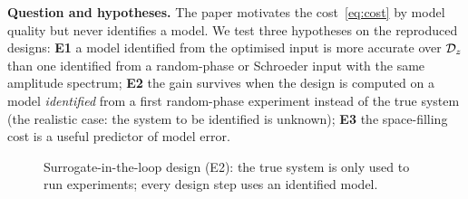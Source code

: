 \textbf{Question and hypotheses.} The paper motivates the cost~\eqref{eq:cost} by model quality but never
identifies a model. We test three hypotheses on the reproduced designs:
\textbf{E1} a model identified from the optimised input is more accurate over $\mathcal{D}_z$ than one identified
from a random-phase or Schroeder input with the same amplitude spectrum;
\textbf{E2} the gain survives when the design is computed on a model \emph{identified} from a first
random-phase experiment instead of the true system (the realistic case: the system to be identified is
unknown);
\textbf{E3} the space-filling cost is a useful predictor of model error.

\begin{figure}[t]\centering\footnotesize
{}
\caption{Surrogate-in-the-loop design (E2): the true system is only used to run experiments; every design
step uses an identified model.}\label{fig:loop}\end{figure}

